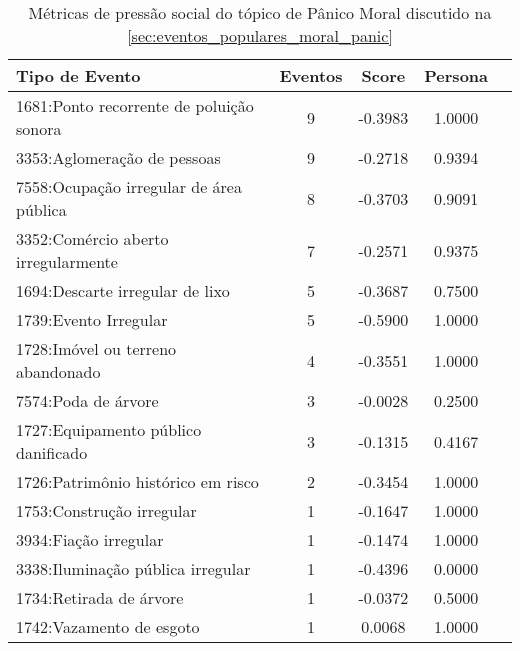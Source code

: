 \begin{table}[htbp]
	\centering
	\caption{Métricas de pressão social do tópico de Pânico Moral discutido na \autoref{sec:eventos_populares_moral_panic}}
	\label{tab:eventos_populares_moral_panic}
	\begin{tabular}{|l|c|c|c|c|}
		\hline
		\textbf{Tipo de Evento}                    & \textbf{Eventos} & \textbf{Score} & \textbf{Persona} \\
		\hline
		1681:Ponto recorrente de poluição sonora   & 9                & -0.3983        & 1.0000           \\
		\hline
		3353:Aglomeração de pessoas                & 9                & -0.2718        & 0.9394           \\
		\hline
		7558:Ocupação irregular de área pública    & 8                & -0.3703        & 0.9091           \\
		\hline
		3352:Comércio aberto irregularmente        & 7                & -0.2571        & 0.9375           \\
		\hline
		1694:Descarte irregular de lixo            & 5                & -0.3687        & 0.7500           \\
		\hline
		1739:Evento Irregular                      & 5                & -0.5900        & 1.0000           \\
		\hline
		1728:Imóvel ou terreno abandonado          & 4                & -0.3551        & 1.0000           \\
		\hline
		7574:Poda de árvore                        & 3                & -0.0028        & 0.2500           \\
		\hline
		1727:Equipamento público danificado        & 3                & -0.1315        & 0.4167           \\
		\hline
		1726:Patrimônio histórico em risco         & 2                & -0.3454        & 1.0000           \\
		\hline
		1753:Construção irregular                  & 1                & -0.1647        & 1.0000           \\
		\hline
		3934:Fiação irregular                      & 1                & -0.1474        & 1.0000           \\
		\hline
		3338:Iluminação pública irregular          & 1                & -0.4396        & 0.0000           \\
		\hline
		1734:Retirada de árvore                    & 1                & -0.0372        & 0.5000           \\
		\hline
		1742:Vazamento de esgoto                   & 1                & 0.0068         & 1.0000           \\

\end{tabular}
\end{table}
